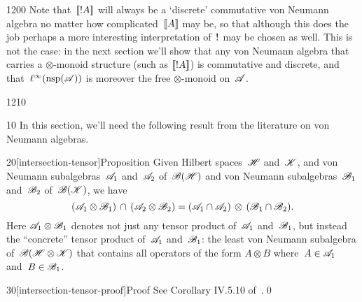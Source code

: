 \begin{parsec}{1200}
Note that~$\llbracket!A\rrbracket$
will always be a `discrete' commutative von Neumann algebra
no matter how complicated~$\llbracket A\rrbracket$ may be,
so that although this does the job
perhaps a more interesting interpretation of~$\mathord{!}$
may be chosen as well.
This is not the case:
in the next
section we'll show that
any von Neumann algebra
that carries 
a $\otimes$-monoid structure
(such as $\llbracket!A\rrbracket$)
is commutative and discrete,
and that~$\ell^\infty(\mathrm{nsp}(\mathscr{A}))$
is moreover the free $\otimes$-monoid
on~$\mathscr{A}$.
\end{parsec}
\begin{parsec}{1210}%
\begin{point}{10}%
In this section,
we'll need the following result
from the literature on von Neumann algebras.
\end{point}
\begin{point}{20}[intersection-tensor]{Proposition}%
Given Hilbert spaces~$\mathscr{H}$ and~$\mathscr{K}$,
and von Neumann subalgebras~$\mathscr{A}_1$ and~$\mathscr{A}_2$
of~$\mathscr{B}(\mathscr{H})$
and von Neumann subalgebras~$\mathscr{B}_1$ and~$\mathscr{B}_2$
of~$\mathscr{B}(\mathscr{K})$,
we have 
\begin{equation*}
(\mathscr{A}_1 \otimes  \mathscr{B}_1)\,\cap\,
(\mathscr{A}_2 \otimes \mathscr{B}_2)
= (\mathscr{A}_1\cap\mathscr{A}_2)\,\otimes\,
(\mathscr{B}_1\cap \mathscr{B}_2).
\end{equation*}
Here
$\mathscr{A}_1 \otimes \mathscr{B}_1$
denotes not just any tensor product of~$\mathscr{A}_1$ and~$\mathscr{B}_1$,
but instead
the ``concrete'' tensor product 
of~$\mathscr{A}_1$ and~$\mathscr{B}_1$:
the least von Neumann subalgebra of~$\mathscr{B}(\mathscr{H}\otimes\mathscr{K})$
that contains all operators
of the form $A\otimes B$ where~$A\in\mathscr{A}_1$
and~$B\in\mathscr{B}_1$.
\begin{point}{30}[intersection-tensor-proof]{Proof}%
See Corollary IV.5.10 of~\cite{Takesaki1}.\qed
\end{point}
\end{point}
\end{parsec}
